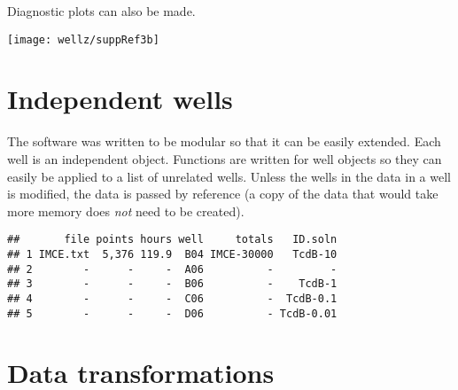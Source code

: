 Diagnostic plots can also be made.

\begin{knitrout}
\color{fgcolor}\begin{kframe}
\begin{alltt}
  \hlstd{=} \hlstd{,}  \hlstd{=} \hlstd{,}  \hlstd{=} \hlstd{)}
\end{alltt}
\end{kframe}
\texttt{[image: wellz/suppRef3b]} 

\end{knitrout}
\section{Independent wells}
The software was written to be modular so that it can be easily extended.
Each well is an independent object. Functions are written for well objects
so they can easily be applied to a list of unrelated wells. Unless the
wells in the data in a well is modified, the data is passed by reference
(a copy of the data that would take more memory does \textit{not} need to be created).

\singlespacing
\begin{knitrout}
\color{fgcolor}\begin{kframe}
\begin{alltt}
 \hlkwb{=} \hlstd{subset[}\hlstd{]}
 \hlkwb{=} \hlstd{subset[}\hlopt{:}\hlstd{]}
 \hlkwb{=} 
\end{alltt}
\begin{verbatim}
##       file points hours well     totals   ID.soln
## 1 IMCE.txt  5,376 119.9  B04 IMCE-30000   TcdB-10
## 2        -      -     -  A06          -         -
## 3        -      -     -  B06          -    TcdB-1
## 4        -      -     -  C06          -  TcdB-0.1
## 5        -      -     -  D06          - TcdB-0.01
\end{verbatim}
\end{kframe}
\end{knitrout}
\doublespacing

\section{Data transformations}

